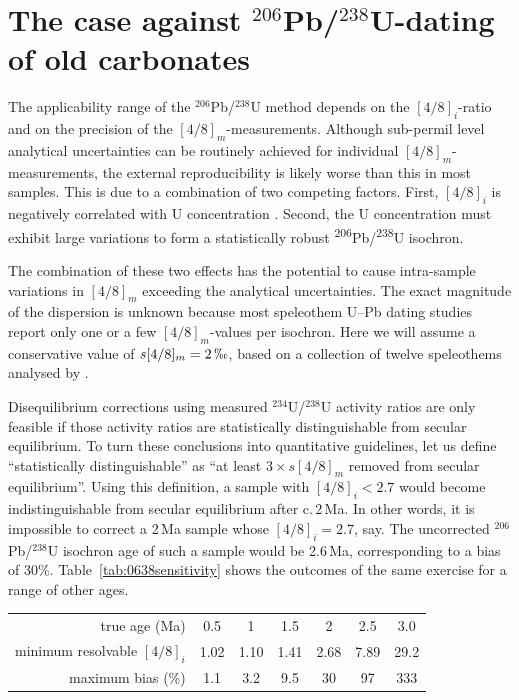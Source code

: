 \documentclass{article}
\begin{document}
\section{The case against ${}^{206}$Pb/${}^{238}$U-dating of old carbonates}
\label{sec:case-against}

The applicability range of the $^{206}$Pb/$^{238}$U method depends on
the $[4/8]_i$-ratio and on the precision of the
$[4/8]_m$-mea\-su\-re\-ments.  Although sub-permil level analytical
uncertainties can be routinely achieved for individual
$[4/8]_m$-measurements, the external reproducibility is likely worse
than this in most samples. This is due to a combination of two
competing factors. First, $[4/8]_i$ is negatively correlated with U
concentration \citep{osmond1976,zhou2005,kuribayashi2025}. Second, the
U concentration must exhibit large variations to form a statistically
robust \textsuperscript{206}Pb/\textsuperscript{238}U
isochron.\medskip

The combination of these two effects has the potential to cause
intra-sample variations in $[4/8]_m$ exceeding the analytical
uncertainties. The exact magnitude of the dispersion is unknown
because most speleothem U--Pb dating studies report only one or a few
$[4/8]_m$-values per isochron. Here we will assume a conservative
value of $s[4/8]_m=2\,\permil$, based on a collection of twelve
speleothems analysed by \citet{walker2006}.\medskip

Disequilibrium corrections using measured $^{234}$U/$^{238}$U activity
ratios are only feasible if those activity ratios are statistically
distinguishable from secular equilibrium. To turn these conclusions
into quantitative guidelines, let us define ``statistically
distinguishable'' as ``at least $3\times{s[4/8]_m}$ removed from
secular equilibrium''. Using this definition, a sample with
$[4/8]_i<2.7$ would become indistinguishable from secular
equilibrium after c.\,2\,Ma.  In other words, it is impossible to
correct a 2\,Ma sample whose $[4/8]_i=2.7$, say. The uncorrected
$^{206}$Pb/$^{238}$U isochron age of such a sample would be 2.6\,Ma,
corresponding to a bias of 30\%. Table~\ref{tab:0638sensitivity} shows
the outcomes of the same exercise for a range of other ages.\medskip

{  \centering
  \begin{tabular}{r|cccccc}
    true age (Ma) & 0.5 & 1 & 1.5 & 2 & 2.5 & 3.0 \\
    minimum resolvable $[4/8]_i$& 1.02 & 1.10 & 1.41 & 2.68 & 7.89 & 29.2\\
    maximum bias (\%) & 1.1 & 3.2 & 9.5 & 30 & 97 & 333\\
  \end{tabular}
  \label{tab:0638sensitivity}\medskip
}%
\end{document}
